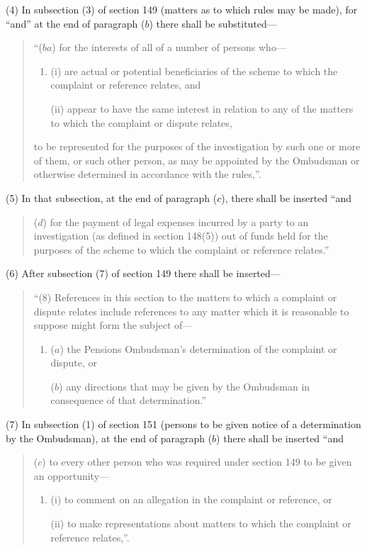 \documentclass[12pt,a4paper]{article}
\begin{document}
(4) In subsection (3)  of section 149 (matters as to which rules may be made), for “and” at the end of paragraph ($b$)  there shall be substituted—
\begin{quotation}
“($ba$) for the interests of all of a number of persons who—
\begin{enumerate}\item[]
(i) are actual or potential beneficiaries of the scheme to which the complaint or reference relates, and

(ii) appear to have the same interest in relation to any of the matters to which the complaint or dispute relates,
\end{enumerate}
to be represented for the purposes of the investigation by such one or more of them, or such other person, as may be appointed by the Ombudsman or otherwise determined in accordance with the rules,”.
\end{quotation}

(5) In that subsection, at the end of paragraph ($c$), there shall be inserted “and
\begin{quotation}
($d$) for the payment of legal expenses incurred by a party to an investigation (as defined in section 148(5)) out of funds held for the purposes of the scheme to which the complaint or reference relates.”
\end{quotation}

(6) After subsection (7)  of section 149 there shall be inserted—
\begin{quotation}
“(8) References in this section to the matters to which a complaint or dispute relates include references to any matter which it is reasonable to suppose might form the subject of—
\begin{enumerate}\item[]
($a$) the Pensions Ombudsman’s determination of the complaint or dispute, or

($b$) any directions that may be given by the Ombudsman in consequence of that determination.”
\end{enumerate}
\end{quotation}

(7) In subsection (1)  of section 151 (persons to be given notice of a determination by the Ombudsman), at the end of paragraph ($b$)  there shall be inserted “and
\begin{quotation}
($c$) to every other person who was required under section 149 to be given an opportunity—
\begin{enumerate}\item[]
(i) to comment on an allegation in the complaint or reference, or

(ii) to make representations about matters to which the complaint or reference relates,”.
\end{enumerate}
\end{quotation}
\end{document}
